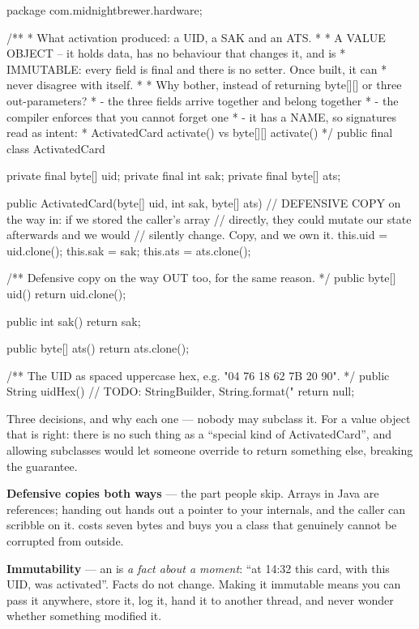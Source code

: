 \begin{jcode}
package com.midnightbrewer.hardware;

/**
 * What activation produced: a UID, a SAK and an ATS.
 *
 * A VALUE OBJECT -- it holds data, has no behaviour that changes it, and is
 * IMMUTABLE: every field is final and there is no setter. Once built, it can
 * never disagree with itself.
 *
 * Why bother, instead of returning byte[][] or three out-parameters?
 *   - the three fields arrive together and belong together
 *   - the compiler enforces that you cannot forget one
 *   - it has a NAME, so signatures read as intent:
 *       ActivatedCard activate()      vs      byte[][] activate()
 */
public final class ActivatedCard {

    private final byte[] uid;
    private final int sak;
    private final byte[] ats;

    public ActivatedCard(byte[] uid, int sak, byte[] ats) {
        // DEFENSIVE COPY on the way in: if we stored the caller's array
        // directly, they could mutate our state afterwards and we would
        // silently change. Copy, and we own it.
        this.uid = uid.clone();
        this.sak = sak;
        this.ats = ats.clone();
    }

    /** Defensive copy on the way OUT too, for the same reason. */
    public byte[] uid() { return uid.clone(); }

    public int sak() { return sak; }

    public byte[] ats() { return ats.clone(); }

    /** The UID as spaced uppercase hex, e.g. "04 76 18 62 7B 20 90". */
    public String uidHex() {
        // TODO: StringBuilder, String.format("%
        return null;
    }
}
\end{jcode}

\begin{concept}{Three decisions, and why each one}
\textbf{} --- nobody may subclass it. For a value object that
is right: there is no such thing as a ``special kind of ActivatedCard'', and
allowing subclasses would let someone override  to return something
else, breaking the guarantee.

\textbf{Defensive copies both ways} --- the part people skip. Arrays in Java are
references; handing out  hands out a pointer to your internals,
and the caller can scribble on it.  costs seven bytes and buys you
a class that genuinely cannot be corrupted from outside.

\textbf{Immutability} --- an  is \emph{a fact about a
moment}: ``at 14:32 this card, with this UID, was activated''. Facts do not
change. Making it immutable means you can pass it anywhere, store it, log it,
hand it to another thread, and never wonder whether something modified it.
\end{concept}


